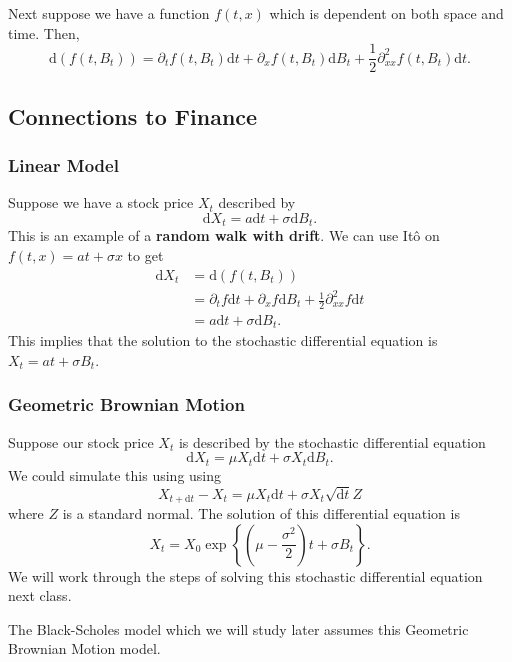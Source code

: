 Next suppose we have a function $f(t,x)$ which is dependent on both space and time. Then, $$ \mathrm d(f(t,B_t)) = \partial_t f(t,B_t)\mathrm dt + \partial_x f(t,B_t)\mathrm dB_t + \frac{1}{2}\partial_{xx}^2 f(t,B_t)\mathrm dt. $$ 

\subsection{Connections to Finance}
\subsubsection{Linear Model}
Suppose we have a stock price $X_t$ described by $$ \mathrm dX_t = a\mathrm dt + \sigma\mathrm dB_t. $$ This is an example of a \textbf{random walk with drift}. We can use It\^{o} on $f(t,x) = at + \sigma x$ to get \begin{align*}
	\mathrm dX_t &= \mathrm d(f(t,B_t)) \\
				 &= \partial_t f\mathrm dt + \partial_x f\mathrm dB_t + \frac{1}{2}\partial_{xx}^2 f\mathrm dt \\
				 &= a\mathrm dt + \sigma\mathrm dB_t.
\end{align*} This implies that the solution to the stochastic differential equation is $X_t = at + \sigma B_t$.

\subsubsection{Geometric Brownian Motion}
Suppose our stock price $X_t$ is described by the stochastic differential equation $$ \mathrm dX_t = \mu X_t \mathrm dt + \sigma X_t \mathrm dB_t. $$ We could simulate this using using $$ X_{t+\mathrm dt} - X_t = \mu X_t \mathrm dt + \sigma X_t \sqrt{\mathrm dt} Z $$ where $Z$ is a standard normal. The solution of this differential equation is $$ X_t = X_0 \exp \left\{ \left( \mu-\frac{\sigma^2}{2} \right) t + \sigma B_t \right\}. $$ We will work through the steps of solving this stochastic differential equation next class.

The Black-Scholes model which we will study later assumes this Geometric Brownian Motion model.

